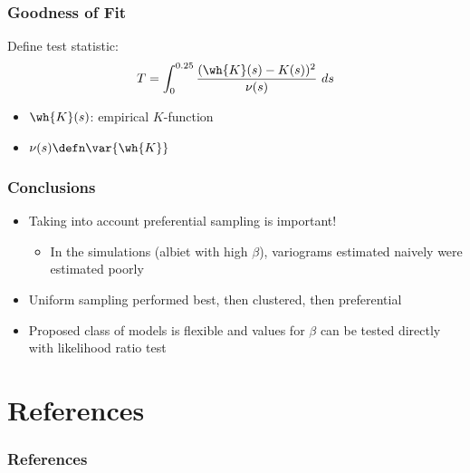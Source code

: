 \documentclass[xcolor=svgnames]{beamer}
\begin{document}
\begin{frame}
\frametitle{Goodness of Fit}
Define test statistic:
$$ T = \int_0^{0.25} \frac{(\wh{K}(s) - K(s))^2}{\nu(s)} \ ds $$
\begin{itemize}
\item $\wh{K}(s)$: empirical $K$-function
\item $\nu(s) \defn \var{\wh{K}}$
\end{itemize}
\end{frame}
\begin{frame}
\frametitle{Conclusions}
\begin{itemize}
\item Taking into account preferential sampling is important!
\begin{itemize}
\item In the simulations (albiet with high $\beta$), variograms estimated naively were estimated poorly
\end{itemize}
\item Uniform sampling performed best, then clustered, then preferential
\item Proposed class of models is flexible and values for $\beta$ can be tested directly with likelihood ratio test
\end{itemize}
\end{frame}

\section{References}
\begin{frame}
\tiny
\frametitle{References}


\end{frame}
\end{document}
